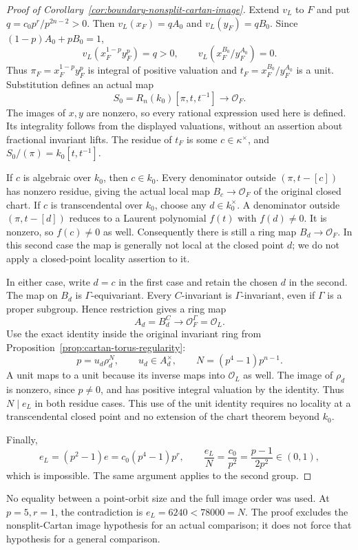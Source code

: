 \begin{proof}[Proof of Corollary~\ref{cor:boundary-nonsplit-cartan-image}]
Extend $v_L$ to $F$ and put $q=c_0p^r/p^{2n-2}>0$.
Then $v_L(x_F)=qA_0$ and $v_L(y_F)=qB_0$. Since
$(1-p)A_0+pB_0=1$,
\[
 v_L(x_F^{1-p}y_F^p)=q>0,\qquad
 v_L(x_F^{B_0}/y_F^{A_0})=0.
\]
Thus $\pi_F=x_F^{1-p}y_F^p$ is integral of positive valuation
and $t_F=x_F^{B_0}/y_F^{A_0}$ is a unit. Substitution defines an
actual map
\[
 S_0=R_n(k_0)[\pi,t,t^{-1}]\longrightarrow\mathcal O_F.
\]
The images of $x,y$ are nonzero, so every rational expression used
here is defined. Its integrality follows from the displayed
valuations, without an assertion about fractional invariant lifts.
The residue of $t_F$ is some $c\in\kappa^\times$, and
$S_0/(\pi)=k_0[t,t^{-1}]$.

If $c$ is algebraic over $k_0$, then $c\in k_0$. Every denominator
outside $(\pi,t-[c])$ has nonzero residue, giving the actual local
map $B_c\to\mathcal O_F$ of the original closed chart.
If $c$ is transcendental over $k_0$, choose any $d\in k_0^\times$.
A denominator outside $(\pi,t-[d])$ reduces to a Laurent polynomial
$f(t)$ with $f(d)\ne0$. It is nonzero, so $f(c)\ne0$ as well.
Consequently there is still a ring map
$B_d\to\mathcal O_F$. In this second case the map is generally
not local at the closed point $d$; we do not apply a closed-point
locality assertion to it.

In either case, write $d=c$ in the first case and retain the chosen
$d$ in the second. The map on $B_d$ is $\Gamma$-equivariant.
Every $C$-invariant is $\Gamma$-invariant, even if $\Gamma$ is a
proper subgroup. Hence restriction gives a ring map
\[
                   A_d=B_d^C\longrightarrow
                   \mathcal O_F^\Gamma=\mathcal O_L.
\]
Use the exact identity inside the original invariant ring from
Proposition~\ref{prop:cartan-torus-regularity}:
\[
              p=u_d\rho_d^N,\qquad u_d\in A_d^\times,
              \qquad N=(p^4-1)p^{n-1}.
\]
A unit maps to a unit because its inverse maps into $\mathcal O_L$
as well. The image of $\rho_d$ is nonzero, since $p\ne0$, and has
positive integral valuation by the identity. Thus $N\mid e_L$
in both residue cases. This use of the unit identity requires no
locality at a transcendental closed point and no extension of
the chart theorem beyond $k_0$.

Finally,
\[
 e_L=(p^2-1)e=c_0(p^4-1)p^r,\qquad
 \frac{e_L}{N}=\frac{c_0}{p^2}
              =\frac{p-1}{2p^2}\in(0,1),
\]
which is impossible. The same argument applies to the second group.
\end{proof}

No equality between a point-orbit size and the full image order
was used. At $p=5,r=1$, the contradiction is
$e_L=6240<78000=N$. The proof excludes the nonsplit-Cartan image
hypothesis for an actual comparison; it does not force that
hypothesis for a general comparison.

